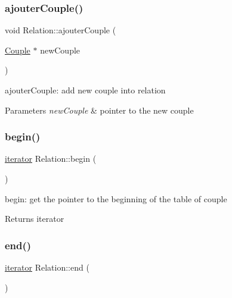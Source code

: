 \subsubsection{\texorpdfstring{ajouter\+Couple()}{ajouterCouple()}}
{\footnotesize\ttfamily void Relation\+::ajouter\+Couple (\begin{DoxyParamCaption}\item[{\hyperlink{class_couple}{Couple} $\ast$}]{new\+Couple }\end{DoxyParamCaption})}



ajouter\+Couple\+: add new couple into relation 


\begin{DoxyParams}{Parameters}
{\em new\+Couple} & pointer to the new couple \\
\hline
\end{DoxyParams}
\mbox{\label{class_relation_aa436b19e8361edc4de25b7b30b3bd010}} 
\subsubsection{\texorpdfstring{begin()}{begin()}}
{\footnotesize\ttfamily \hyperlink{class_relation_1_1iterator}{iterator} Relation\+::begin (\begin{DoxyParamCaption}{ }\end{DoxyParamCaption})\hspace{0.3cm}{\ttfamily [inline]}}



begin\+: get the pointer to the beginning of the table of couple 

\begin{DoxyReturn}{Returns}
iterator 
\end{DoxyReturn}
\mbox{\label{class_relation_aee4ecfac883dc307d257d6976e7a191b}} 
\subsubsection{\texorpdfstring{end()}{end()}}
{\footnotesize\ttfamily \hyperlink{class_relation_1_1iterator}{iterator} Relation\+::end (\begin{DoxyParamCaption}{ }\end{DoxyParamCaption})\hspace{0.3cm}{\ttfamily [inline]}}



